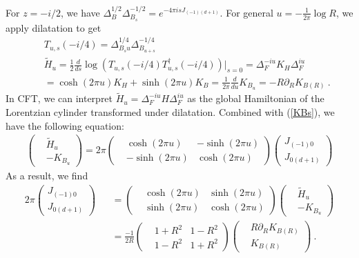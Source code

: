 \documentclass[a4paper,11pt]{article}
\theoremstyle{definition}
\newcommand{\nn}{\nonumber}
\newcommand{\NL}[1]{\textcolor{blue}{#1}}
\newcommand{\p}{\partial}
\begin{document}
For $z = -i/2$, we have $\Delta_{B}^{1/2}\Delta_{B_s}^{-1/2} = e^{-4\pi i s J_{(-1)(d+1)}}$. %
For general $u = -\frac{1}{2\pi}\log R$, we apply dilatation to get
\begin{eqnarray}
&&T_{u,s}(-i/4)=\Delta_{B_su}^{1/4}\Delta_{B_{u+s}}^{-1/4}\nn\\
&&\tilde{H}_{u}= \frac{1}{2}\frac{d}{ds}\log(T_{u,s}(-i/4)T_{u,s}^\dagger(-i/4))\Big|_{s=0} = \Delta_F^{-iu}K_H \Delta_F^{iu}\nn\\
&&=\cosh(2\pi u)K_H+\sinh(2\pi u)K_B=\frac{1}{2\pi}\frac{d}{du}K_{B_u}=-R\p_R K_{B(R)}\ .
\end{eqnarray}
In CFT, we can interpret $\tilde{H}_{u}= \Delta_F^{-iu}H \Delta_F^{iu}$ as the global Hamiltonian of the Lorentzian cylinder transformed under dilatation.
Combined with (\ref{KBs}), we have the following equation:
\begin{eqnarray}
    \begin{pmatrix}
        & \tilde{H}_u \\
        & -K_{B_u}
    \end{pmatrix}
    =2\pi\begin{pmatrix}
        &\cosh(2\pi u) & -\sinh(2\pi u)  \\
         & -\sinh(2\pi u)& \cosh(2\pi u)
    \end{pmatrix}
    \begin{pmatrix}
        J_{(-1)0}\\
        J_{0(d+1)}
    \end{pmatrix}
\end{eqnarray}
As a result, we find
    \begin{eqnarray}
    2\pi\begin{pmatrix}
    J_{(-1)0}\\
        J_{0(d+1)}
    \end{pmatrix}
    &&=\begin{pmatrix}
        &\cosh(2\pi u) & \sinh(2\pi u)  \\
         &\sinh(2\pi u)& \cosh(2\pi u)
    \end{pmatrix}
    \begin{pmatrix}
        & \tilde{H}_{u} \\
        & -K_{B_u}
    \end{pmatrix}\nn\\
    &&=\frac{-1}{2R}\begin{pmatrix}
        &1+R^2 & 1-R^2  \\
         &1-R^2& 1+R^2
    \end{pmatrix}
    \begin{pmatrix}
        & R\p_R K_{B(R)}\\
        & K_{B(R)}
    \end{pmatrix}\ .
\end{eqnarray}
\end{document}
